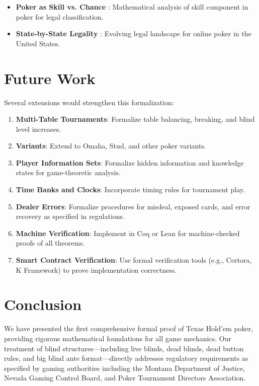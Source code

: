\documentclass[11pt,a4paper]{article}
\begin{document}
\begin{itemize}
    \item \textbf{Poker as Skill vs. Chance} \cite{alon2012skill}: Mathematical analysis of skill component in poker for legal classification.
    \item \textbf{State-by-State Legality} \cite{usonlinepoker2025}: Evolving legal landscape for online poker in the United States.
\end{itemize}

\section{Future Work}

Several extensions would strengthen this formalization:

\begin{enumerate}
    \item \textbf{Multi-Table Tournaments}: Formalize table balancing, breaking, and blind level increases.

    \item \textbf{Variants}: Extend to Omaha, Stud, and other poker variants.

    \item \textbf{Player Information Sets}: Formalize hidden information and knowledge states for game-theoretic analysis.

    \item \textbf{Time Banks and Clocks}: Incorporate timing rules for tournament play.

    \item \textbf{Dealer Errors}: Formalize procedures for misdeal, exposed cards, and error recovery as specified in regulations.

    \item \textbf{Machine Verification}: Implement in Coq or Lean for machine-checked proofs of all theorems.

    \item \textbf{Smart Contract Verification}: Use formal verification tools (e.g., Certora, K Framework) to prove implementation correctness.
\end{enumerate}

\section{Conclusion}

We have presented the first comprehensive formal proof of Texas Hold'em poker, providing rigorous mathematical foundations for all game mechanics. Our treatment of blind structures—including live blinds, dead blinds, dead button rules, and big blind ante format—directly addresses regulatory requirements as specified by gaming authorities including the Montana Department of Justice, Nevada Gaming Control Board, and Poker Tournament Directors Association.
\end{document}

